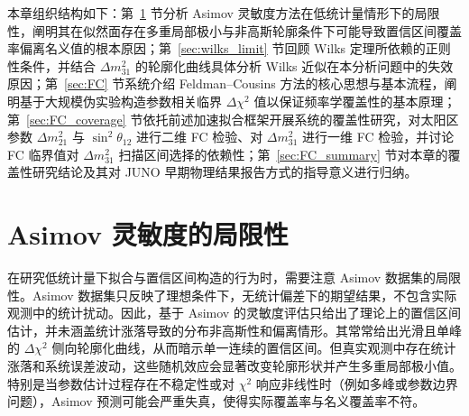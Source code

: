 本章组织结构如下：第~\ref{sec:asimov_limitation} 节分析 Asimov 灵敏度方法在低统计量情形下的局限性，阐明其在似然面存在多重局部极小与非高斯轮廓条件下可能导致置信区间覆盖率偏离名义值的根本原因；第~\ref{sec:wilks_limit} 节回顾 Wilks 定理所依赖的正则性条件，并结合 $\Delta m^2_{31}$ 的轮廓化曲线具体分析 Wilks 近似在本分析问题中的失效原因；第~\ref{sec:FC} 节系统介绍 Feldman--Cousins 方法的核心思想与基本流程，阐明基于大规模伪实验构造参数相关临界 $\Delta\chi^2$ 值以保证频率学覆盖性的基本原理；第~\ref{sec:FC_coverage} 节依托前述加速拟合框架开展系统的覆盖性研究，对太阳区参数 $\Delta m^2_{21}$ 与 $\sin^2\theta_{12}$ 进行二维 FC 检验、对 $\Delta m^2_{31}$ 进行一维 FC 检验，并讨论 FC 临界值对 $\Delta m^2_{31}$ 扫描区间选择的依赖性；第~\ref{sec:FC_summary} 节对本章的覆盖性研究结论及其对 JUNO 早期物理结果报告方式的指导意义进行归纳。


\section{Asimov 灵敏度的局限性}
\label{sec:asimov_limitation}

在研究低统计量下拟合与置信区间构造的行为时，需要注意 Asimov 数据集的局限性。Asimov 数据集只反映了理想条件下，无统计偏差下的期望结果，不包含实际观测中的统计扰动。因此，基于 Asimov 的灵敏度评估只给出了理论上的置信区间估计，并未涵盖统计涨落导致的分布非高斯性和偏离情形。其常常给出光滑且单峰的 $\Delta \chi^2$ 侧向轮廓化曲线，从而暗示单一连续的置信区间。但真实观测中存在统计涨落和系统误差波动，这些随机效应会显著改变轮廓形状并产生多重局部极小值。特别是当参数估计过程存在不稳定性或对 $\chi^2$ 响应非线性时（例如多峰或参数边界问题），Asimov 预测可能会严重失真，使得实际覆盖率与名义覆盖率不符。


